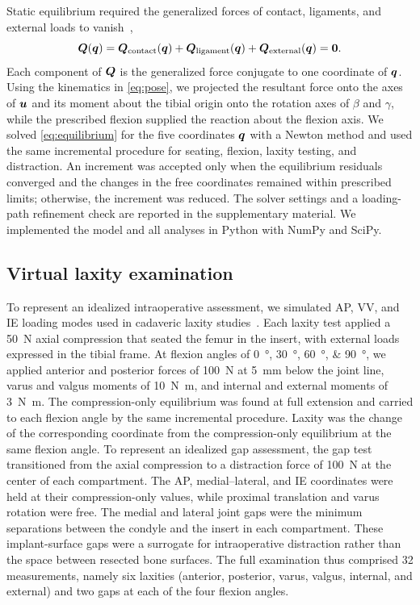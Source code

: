 Static equilibrium required the generalized forces of contact, ligaments, and external loads to vanish~\autocite{wismans1980three,blankevoort1991articular},
\begin{equation}
\mbox{\boldmath $Q$}{}(\mbox{\boldmath $q$}{}) = \mbox{\boldmath $Q$}{}_\mathrm{contact}(\mbox{\boldmath $q$}{}) + \mbox{\boldmath $Q$}{}_\mathrm{ligament}(\mbox{\boldmath $q$}{}) + \mbox{\boldmath $Q$}{}_\mathrm{external}(\mbox{\boldmath $q$}{}) = \mbox{\boldmath $0$}{}.
\label{eq:equilibrium}
\end{equation}
Each component of $\mbox{\boldmath $Q$}{}$ is the generalized force conjugate to one coordinate of $\mbox{\boldmath $q$}{}$.
Using the kinematics in \autoref{eq:pose}, we projected the resultant force onto the axes of $\mbox{\boldmath $u$}{}$ and its moment about the tibial origin onto the rotation axes of $\beta$ and $\gamma$, while the prescribed flexion supplied the reaction about the flexion axis.
We solved \autoref{eq:equilibrium} for the five coordinates $\mbox{\boldmath $q$}{}$ with a Newton method and used the same incremental procedure for seating, flexion, laxity testing, and distraction.
An increment was accepted only when the equilibrium residuals converged and the changes in the free coordinates remained within prescribed limits; otherwise, the increment was reduced.
The solver settings and a loading-path refinement check are reported in the supplementary material.
We implemented the model and all analyses in Python with NumPy and SciPy.

\subsection{Virtual laxity examination}

To represent an idealized intraoperative assessment, we simulated AP, VV, and IE loading modes used in cadaveric laxity studies~\autocite{markolf1976stiffness,harris2016combined}.
Each laxity test applied a \SI{50}{\newton} axial compression that seated the femur in the insert, with external loads expressed in the tibial frame.
At flexion angles of \SIlist{0;30;60;90}{\degree}, we applied anterior and posterior forces of \SI{100}{\newton} at \SI{5}{\milli\meter} below the joint line, varus and valgus moments of \SI{10}{\newton\meter}, and internal and external moments of \SI{3}{\newton\meter}.
The compression-only equilibrium was found at full extension and carried to each flexion angle by the same incremental procedure.
Laxity was the change of the corresponding coordinate from the compression-only equilibrium at the same flexion angle.
To represent an idealized gap assessment, the gap test transitioned from the axial compression to a distraction force of \SI{100}{\newton} at the center of each compartment.
The AP, medial--lateral, and IE coordinates were held at their compression-only values, while proximal translation and varus rotation were free.
The medial and lateral joint gaps were the minimum separations between the condyle and the insert in each compartment.
These implant-surface gaps were a surrogate for intraoperative distraction rather than the space between resected bone surfaces.
The full examination thus comprised 32 measurements, namely six laxities (anterior, posterior, varus, valgus, internal, and external) and two gaps at each of the four flexion angles.

